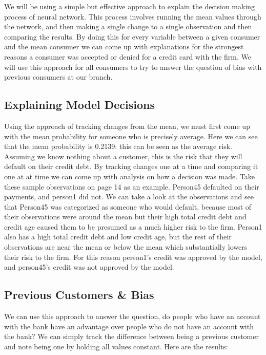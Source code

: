 \documentclass[12pt]{article}
\begin{document}
	We will be using a simple but effective approach to explain the decision making process of neural network. This process involves running the mean values through the network, and then making a single change to a single observation and then comparing the results. By doing this for every variable between a given consumer and the mean consumer we can come up with explanations for the strongest reasons a consumer was accepted or denied for a credit card with the firm. We will use this approach for all consumers to try to answer the question of bias with previous consumers at our branch. 
	

	\subsection{Explaining Model Decisions}
	Using the approach of tracking changes from the mean, we must first come up with the mean probability for someone who is precisely average. Here we can see that the mean probability is 0.2139: this can be seen as the average risk. Assuming we know nothing about a customer, this is the risk that they will default on their credit debt. By tracking changes one at a time and comparing it one at at time we can come up with analysis on how a decision was made. Take these sample observations on page 14 as an example.
	 Person45 defaulted on their payments, and person1 did not. We can take a look at the observations and see that Person45 was categorized as someone who would default, because most of their observations were around the mean but their high total credit debt and credit age caused them to be presumed as a much higher risk to the firm. 
	 Person1 also has a high total credit debt and low credit age, but the rest of their observations are near the mean or below the mean which substantially lowers their risk to the firm. For this reason person1's credit was approved by the model, and person45's credit was not approved by the model. 
	
	
	
	\subsection{Previous Customers \& Bias}
	
	We can use this approach to answer the question, do people who have an account with the bank have an advantage over people who do not have an account with the bank? We can simply track the difference between being a previous customer and note being one by holding all values constant. Here are the results: 
	
\end{document}
